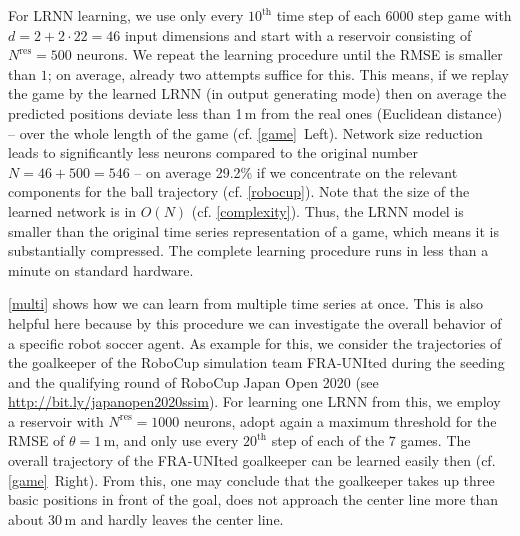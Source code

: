 \documentclass{sn-jnl}
\theoremstyle{definition}
\begin{document}
For LRNN learning, we use only every $10^\text{th}$ time step of each 6000 step game with $d =
2+2 \cdot 22 = 46$ input dimensions and start with a reservoir consisting of
$N^\mathrm{res} = 500$ neurons. We repeat the learning procedure until the RMSE
is smaller than $1$; on average, already two attempts suffice for this. This
means, if we replay the game by the learned LRNN (in output generating mode)
then on average the predicted positions deviate less than 1\,m from the real
ones (Euclidean distance) -- over the whole length of the game (cf.
\cref{game}~Left). Network size reduction leads to significantly less neurons
compared to the original number $N = 46+500 = 546$ -- on average 29.2\% if we
concentrate on the relevant components for the ball trajectory (cf.
\cref{robocup}). Note that the size of the learned network is in $O(N)$ (cf.
\cref{complexity}). Thus, the LRNN model is smaller than the original time
series representation of a game, which means it is substantially compressed. The
complete learning procedure runs in less than a minute on standard hardware.

\cref{multi} shows how we can learn from multiple time series at once. This is
also helpful here because by this procedure we can investigate the overall
behavior of a specific robot soccer agent. As example for this, we consider the
trajectories of the goalkeeper of the RoboCup simulation team FRA-UNIted during
the seeding and the qualifying round of RoboCup Japan Open 2020 (see
\url{http://bit.ly/japanopen2020ssim}). For learning one LRNN from this, we employ a
reservoir with $N^\mathrm{res} = 1000$ neurons, adopt again a maximum threshold
for the RMSE of $\theta = 1$\,m, and only use every $20^\text{th}$ step of each of the
$7$ games. The overall trajectory of the FRA-UNIted goalkeeper can be learned
easily then (cf. \cref{game}~Right). From this, one may conclude that the
goalkeeper takes up three basic positions in front of the goal, does not
approach the center line more than about 30\,m and hardly leaves the center
line.
\end{document}
